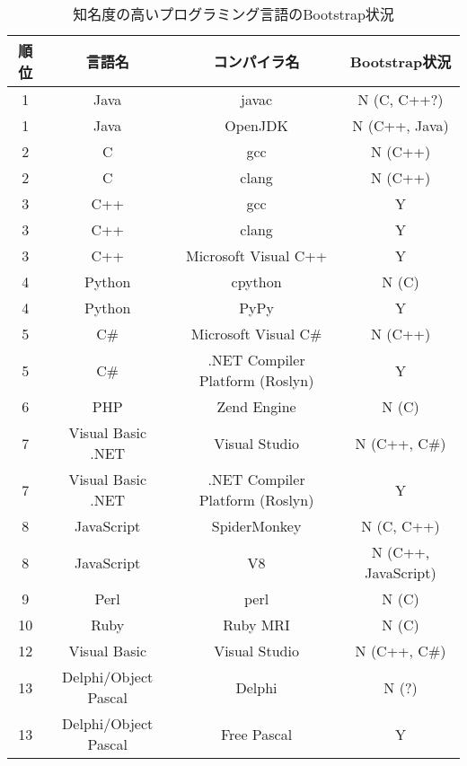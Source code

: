 \begin{table}[tb]
    \begin{center}
        \caption{知名度の高いプログラミング言語のBootstrap状況}
        \begin{tabular}{|c|c|c|c|}
            \hline
            順位 & 言語名 & コンパイラ名 & Bootstrap状況 \\
            \hline
            1 & Java & javac & N (C, C++?) \\
            \hline
            1 & Java & OpenJDK & N (C++, Java) \\
            \hline
            2 & C & gcc & N (C++) \\
            \hline
            2 & C & clang & N (C++) \\
            \hline
            3 & C++ & gcc & Y \\
            \hline
            3 & C++ & clang & Y \\
            \hline
            3 & C++ & Microsoft Visual C++ & Y \\
            \hline
            4 & Python & cpython & N (C) \\
            \hline
            4 & Python & PyPy & Y \\
            \hline
            5 & C\# & Microsoft Visual C\# & N (C++) \\
            \hline
            5 & C\# & .NET Compiler Platform (Roslyn) & Y \\
            \hline
            6 & PHP & Zend Engine & N (C) \\
            \hline
            7 & Visual Basic .NET & Visual Studio & N (C++, C\#) \\
            \hline
            7 & Visual Basic .NET & .NET Compiler Platform (Roslyn) & Y \\
            \hline
            8 & JavaScript & SpiderMonkey & N (C, C++) \\
            \hline
            8 & JavaScript & V8 & N (C++, JavaScript) \\
            \hline
            9 & Perl & perl & N (C) \\
            \hline
            10 & Ruby & Ruby MRI & N (C) \\
            \hline
            12 & Visual Basic & Visual Studio & N (C++, C\#) \\
            \hline
            13 & Delphi/Object Pascal & Delphi & N (?) \\
            \hline
            13 & Delphi/Object Pascal & Free Pascal & Y \\

\end{tabular}
\end{center}
\end{table}
